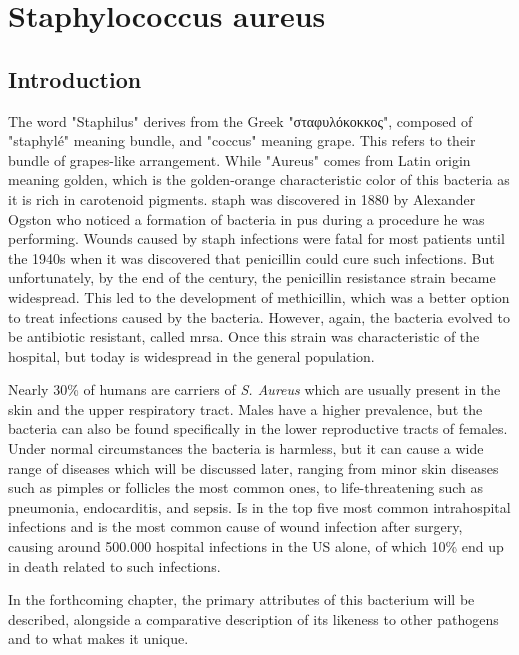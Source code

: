 \chapter{Staphylococcus aureus}\label{ch:staph}

\section{Introduction}

The word "Staphilus" derives from the Greek "σταφυλόκοκκος", composed of "staphylé" meaning bundle, and "coccus" meaning grape. This refers to their bundle of grapes-like arrangement. While "Aureus" comes from Latin origin meaning golden, which is the golden-orange characteristic color of this bacteria as it is rich in carotenoid pigments. \gls{staph} was discovered in 1880 by Alexander Ogston who noticed a formation of bacteria in pus during a procedure he was performing. Wounds caused by \gls{staph} infections were fatal for most patients until the 1940s when it was discovered that penicillin could cure such infections. But unfortunately, by the end of the century, the penicillin resistance strain became widespread. This led to the development of methicillin, which was a better option to treat infections caused by the bacteria. However, again, the bacteria evolved to be antibiotic resistant, called \gls{mrsa}. Once this strain was characteristic of the hospital, but today is widespread in the general population.

Nearly 30\% of humans are carriers of \textit{S. Aureus} which are usually present in the skin and the upper respiratory tract. Males have a higher prevalence, but the bacteria can also be found specifically in the lower reproductive tracts of females. Under normal circumstances the bacteria is harmless, but it can cause a wide range of diseases which will be discussed later, ranging from minor skin diseases such as pimples or follicles the most common ones, to life-threatening such as pneumonia, endocarditis, and sepsis. Is in the top five most common intrahospital infections and is the most common cause of wound infection after surgery, causing around 500.000 hospital infections in the US alone, of which 10\% end up in death related to such infections.

In the forthcoming chapter, the primary attributes of this bacterium will be described, alongside a comparative description of its likeness to other pathogens and to what makes it unique.

